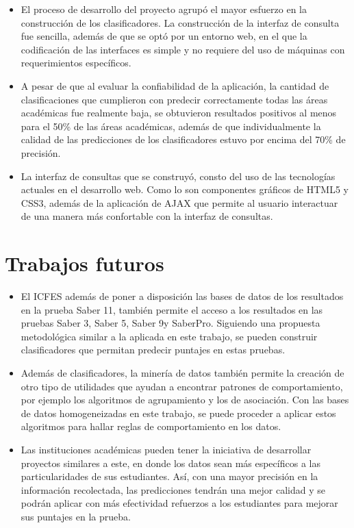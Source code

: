 \begin{itemize}
\item El proceso de desarrollo del proyecto agrupó el mayor esfuerzo en la construcción de los clasificadores. La construcción de la interfaz de consulta fue sencilla, además de que se optó por un entorno web, en el que la codificación de las interfaces es simple y no requiere del uso de máquinas con requerimientos específicos.

\item A pesar de que al evaluar la confiabilidad de la aplicación, la cantidad de clasificaciones que cumplieron con predecir correctamente todas las áreas académicas fue realmente baja, se obtuvieron resultados positivos al menos para el 50\% de las áreas académicas, además de que individualmente la calidad de las predicciones de los clasificadores estuvo por encima del 70\% de precisión.

\item La interfaz de consultas que se construyó, consto del uso de las tecnologías actuales en el desarrollo web. Como lo son componentes gráficos de HTML5 y CSS3, además de la aplicación de AJAX que permite al usuario interactuar de una manera más confortable con la interfaz de consultas.
\end{itemize}
\section{Trabajos futuros}
\begin{itemize}
\item El ICFES además de poner a disposición las bases de datos de los resultados en la prueba Saber 11\degree, también permite el acceso a los resultados en las pruebas Saber 3\degree, Saber 5\degree, Saber 9\degree y SaberPro. Siguiendo una propuesta metodológica similar a la aplicada en este trabajo, se pueden construir clasificadores que permitan predecir puntajes en estas pruebas.

\item Además de clasificadores, la minería de datos también permite la creación de otro tipo de utilidades que ayudan a encontrar patrones de comportamiento, por ejemplo los algoritmos de agrupamiento y los de asociación. Con las bases de datos homogeneizadas en este trabajo, se puede proceder a aplicar estos algoritmos para hallar reglas de comportamiento en los datos.

\item Las instituciones académicas pueden tener la iniciativa de desarrollar proyectos similares a este, en donde los datos sean más específicos a las particularidades de sus estudiantes. Así, con una mayor precisión en la información recolectada, las predicciones tendrán una mejor  calidad y se podrán aplicar con más efectividad refuerzos a los estudiantes para mejorar sus puntajes en la prueba.
\end{itemize}